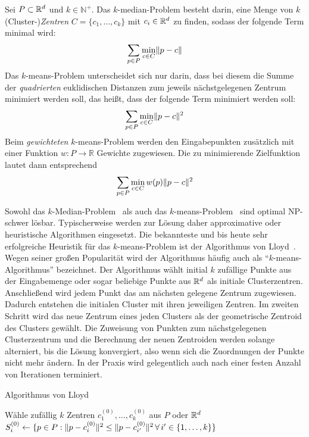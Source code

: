 \begin{definition}
\label{def:kmeans-kmedian}
Sei $P \subset \mathbb{R}^{d}$ und $k \in \mathbb{N}^{+}$. Das $k$-median-Problem besteht darin, eine Menge von $k$ (Cluster-)\emph{Zentren}
$C = \{ c_1, \dots, c_k \}$ mit $c_i \in \mathbb{R}^{d}$ zu finden, sodass der folgende Term minimal wird:
\[ \sum_{p \in P} \min_{c \in C} \lVert {p} - {c} \rVert \]
Das $k$-means-Problem unterscheidet sich nur darin, dass bei diesem die Summe der \emph{quadrierten} euklidischen Distanzen
zum jeweils nächstgelegenen Zentrum minimiert werden soll, das heißt, dass der folgende Term minimiert werden soll:
\[ \sum_{p \in P} \min_{c \in C} \lVert {p} - {c} \rVert^2 \]
Beim \emph{gewichteten} $k$-means-Problem werden den Eingabepunkten zusätzlich mit einer Funktion $w : P \rightarrow \mathbb{R}$
Gewichte zugewiesen. Die zu minimierende Zielfunktion lautet dann entsprechend
\[ \sum_{p \in P} \min_{c \in C} w(p) \lVert {p} - {c} \rVert^2 \]
\end{definition}
Sowohl das $k$-Median-Problem~\cite{MegiddoS84} als auch das $k$-means-Problem~\cite{AloiseDHP09} sind optimal NP-schwer lösbar.
Typischerweise werden zur Lösung daher approximative oder heuristische Algorithmen eingesetzt. Die bekannteste und bis
heute sehr erfolgreiche Heuristik für das $k$-means-Problem ist der Algorithmus von Lloyd~\cite{Lloyd82}. Wegen seiner
großen Popularität wird der Algorithmus häufig auch als "`$k$-means-Algorithmus"' bezeichnet.
Der Algorithmus wählt initial $k$ zufällige Punkte aus der Eingabemenge oder sogar beliebige Punkte aus $\mathbb{R}^{d}$ als initiale
Clusterzentren. Anschließend wird jedem Punkt das am nächsten gelegene Zentrum zugewiesen. Dadurch entstehen die initialen Cluster
mit ihren jeweiligen Zentren. Im zweiten Schritt wird das neue Zentrum eines jeden Clusters als der geometrische Zentroid
des Clusters gewählt. Die Zuweisung von Punkten zum nächstgelegenen Clusterzentrum und die Berechnung der neuen Zentroiden werden
solange alterniert, bis die Lösung konvergiert, also wenn sich die Zuordnungen der Punkte nicht mehr ändern. In der Praxis
wird gelegentlich auch nach einer festen Anzahl von Iterationen terminiert.

\begin{algorithm}[H]
\label{algo:lloyd}
\caption{Algorithmus von Lloyd}
	\DontPrintSemicolon
	
	\BlankLine
	
	Wähle zufällig $k$ Zentren $c_1^{(0)}, \dots, c_k^{(0)}$ aus $P$ oder $\mathbb{R}^{d}$\;
	$S_i^{(0)} \leftarrow \{ p \in P : \lVert {p} - {c_i^{(0)}} \rVert^2 \leq \lVert {p} - {c_{i'}^{(0)}} \rVert^2 \, \forall \, i' \in \{ 1, \dots, k \} \}$\;
\end{algorithm}

